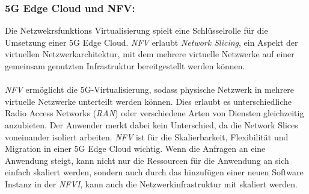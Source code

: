 \documentclass[runningheads]{llncs}
\numberwithin{figure}{section}
\begin{document}
\subsubsection{5G Edge Cloud und NFV:}
Die Netzwekrsfunktions Virtualisierung spielt eine Schlüsselrolle für die Umsetzung einer 5G Edge Cloud.
\textit{NFV} erlaubt \textit{Network Slicing}, ein Aspekt der virtuellen Netzwerkarchitektur, 
mit dem mehrere virtuelle Netzwerke auf einer gemeinsam genutzten Infrastruktur bereitgestellt werden können.
\\
\\
\textit{NFV} ermöglicht die 5G-Virtualisierung, sodass physische Netzwerk in mehrere virtuelle Netzwerke unterteilt werden können. 
Dies erlaubt es unterschiedliche Radio Access Networks (\textit{RAN}) 
oder verschiedene Arten von Diensten gleichzeitig anzubieten. Der Anwender merkt dabei kein Unterschied, da die Network Slices
voneinander isoliert arbeiten. 
\textit{NFV} ist für die Skalierbarkeit, Flexibilität und Migration in einer 5G Edge Cloud wichtig. Wenn die Anfragen an eine
Anwendung steigt, kann nicht nur die Ressourcen für die Anwendung an sich einfach skaliert werden, sondern auch durch das hinzufügen einer neuen
Software Instanz in der \textit{NFVI}, kann auch die Netzwerkinfrastruktur mit skaliert werden. \cite{How5GNFV}
\end{document}
